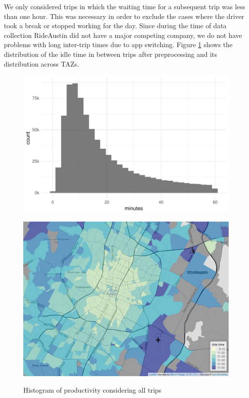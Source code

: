 \documentclass[a4paper, 11pt]{article}
\begin{document}
We only considered trips in which the waiting time for a subsequent trip was less than one hour. This was necessary in order to exclude the cases where the driver took a break or stopped working for the day. Since during the time of data collection RideAustin did not have a major competing company, we do not have problems with long inter-trip times due to app switching. Figure \ref{fig:idledist} shows the distribution of the idle time in between trips after preprocessing and its distribution across TAZs.


\begin{figure}[tb]
    \centering
    \begin{minipage}[tb]{.8\linewidth}
        \centering
        \includegraphics[width=0.8\linewidth]{img/idletime_hist.pdf}
        \label{fig:idlehist}
    \end{minipage}\hfill
    \begin{minipage}[tb]{.8\linewidth}
        \centering
        \includegraphics[width=0.8\linewidth]{img/idletime_spatial.jpeg}
        \label{fig:idlemap}
    \end{minipage}%
    \caption{Histogram of productivity considering all trips}
    \label{fig:idledist}
\end{figure}
\end{document}
